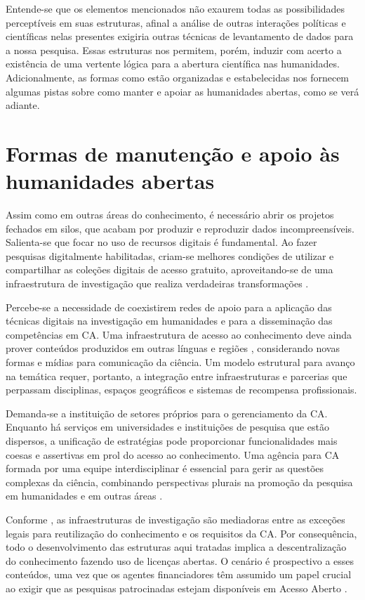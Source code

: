 \documentclass[portuguese]{textolivre}
\begin{document}
Entende-se que os elementos mencionados não exaurem todas as possibilidades perceptíveis em suas estruturas, afinal a análise de outras interações políticas e científicas nelas presentes exigiria outras técnicas de levantamento de dados para a nossa pesquisa. Essas estruturas nos permitem, porém, induzir com acerto a existência de uma vertente lógica para a abertura científica nas humanidades. Adicionalmente, as formas como estão organizadas e estabelecidas nos fornecem algumas pistas sobre como manter e apoiar as humanidades abertas, como se verá adiante.

\section{Formas de manutenção e apoio às humanidades abertas}\label{sec-organizacao-latex}
Assim como em outras áreas do conhecimento, é necessário abrir os projetos fechados em silos, que acabam por produzir e reproduzir dados incompreensíveis. Salienta-se que focar no uso de recursos digitais é fundamental. Ao fazer pesquisas digitalmente habilitadas, criam-se melhores condições de utilizar e compartilhar as coleções digitais de acesso gratuito, aproveitando-se de uma infraestrutura de investigação que realiza verdadeiras transformações \cite{ell2013}.

Percebe-se a necessidade de coexistirem redes de apoio para a aplicação das técnicas digitais na investigação em humanidades e para a disseminação das competências em CA. Uma infraestrutura de acesso ao conhecimento deve ainda prover conteúdos produzidos em outras línguas e regiões \cite{mounier2023}, considerando novas formas e mídias para comunicação da ciência. Um modelo estrutural para avanço na temática requer, portanto, a integração entre infraestruturas e parcerias que perpassam disciplinas, espaços geográficos e sistemas de recompensa profissionais.

Demanda-se a instituição de setores próprios para o gerenciamento da CA. Enquanto há serviços em universidades e instituições de pesquisa que estão dispersos, a unificação de estratégias pode proporcionar funcionalidades mais coesas e assertivas em prol do acesso ao conhecimento. Uma agência para CA formada por uma equipe interdisciplinar é essencial para gerir as questões complexas da ciência, combinando perspectivas plurais na promoção da pesquisa em humanidades e em outras áreas \cite{ribeiro2024}.

Conforme \textcite{kamal2023}, as infraestruturas de investigação são mediadoras entre as exceções legais para reutilização do conhecimento e os requisitos da CA. Por consequência, todo o desenvolvimento das estruturas aqui tratadas implica a descentralização do conhecimento fazendo uso de licenças abertas. O cenário é prospectivo a esses conteúdos, uma vez que os agentes financiadores têm assumido um papel crucial ao exigir que as pesquisas patrocinadas estejam disponíveis em Acesso Aberto \cite{else2021}.
\end{document}
